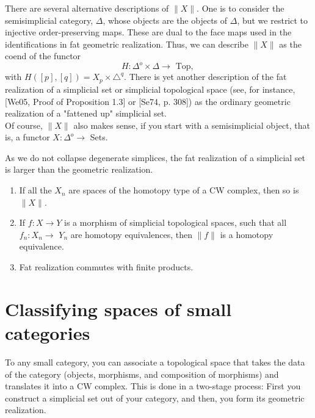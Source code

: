 There are several alternative descriptions of $\|X\|$. One is to consider the semisimplicial category, $\Delta$, whose objects are the objects of $\Delta$, but we restrict to injective order-preserving maps. These are dual to the face maps used in the identifications in fat geometric realization. Thus, we can describe $\|X\|$ as the coend of the functor
$$
H: \Delta^o \times \Delta \rightarrow \text { Top, }
$$
with $H([p],[q])=X_p \times \triangle^q$.
There is yet another description of the fat realization of a simplicial set or simplicial topological space (see, for instance, [We05, Proof of Proposition 1.3] or [Se74, p. 308]) as the ordinary geometric realization of a "fattened up" simplicial set.\\
Of course, $\|X\|$ also makes sense, if you start with a semisimplicial object, that is, a functor $X: \Delta^o \rightarrow$ Sets.

As we do not collapse degenerate simplices, the fat realization of a simplicial set is larger than the geometric realization.
\begin{prop}
    \begin{enumerate}
        \item If all the $X_n$ are spaces of the homotopy type of a CW complex, then so is $\|X\|$.
        \item If $f: X \rightarrow Y$ is a morphism of simplicial topological spaces, such that all $f_n: X_n \rightarrow$ $Y_n$ are homotopy equivalences, then $\|f\|$ is a homotopy equivalence.
        \item Fat realization commutes with finite products.
    \end{enumerate}
\end{prop}



\section{Classifying spaces of small categories}
To any small category, you can associate a topological space that takes the data of the category (objects, morphisms, and composition of morphisms) and translates it into a CW complex. This is done in a two-stage process: First you construct a simplicial set out of your category, and then, you form its geometric realization.


